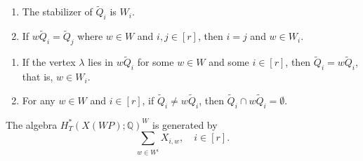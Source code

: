 \documentclass[10pt,a4paper]{amsart}
\begin{document}
\begin{lemma} \label{lem-stab}
  \leavevmode
  \begin{enumerate}
      \item \label{lem-stab-1} The stabilizer of $\widetilde{Q}_i$ is $W_i$.
      \item \label{lem-stab-2} If $w \widetilde{Q}_i = \widetilde{Q}_j$ where $w \in W$ and $i,j \in [r]$, then $i = j$ and $w \in W_i$.
  \end{enumerate}
\end{lemma}

\begin{lemma} \label{lem-facet}
    \leavevmode
    \begin{enumerate}
      \item \label{lem-facet-1} If the vertex $\lambda$ lies in $w \widetilde{Q}_i$ for some $w \in W$ and some $i \in [r]$, then $\widetilde{Q}_i = w \widetilde{Q}_i$, that is, $w \in W_i$.
      \item \label{lem-facet-2} For any $w \in W$ and $i \in [r]$, if $\widetilde{Q}_i \ne w \widetilde{Q}_i$, then $\widetilde{Q}_i \cap w \widetilde{Q}_i = \emptyset$. 
    \end{enumerate}
\end{lemma}

\begin{lemma} \label{lem-T-coh-gen}
    The algebra $H^*_T(X(\mathit{WP}) ; \mathbb{Q})^W$ is generated by 
    \[\sum_{w \in W^i} X_{i,w}, \quad i \in [r].\]
\end{lemma}
\end{document}
